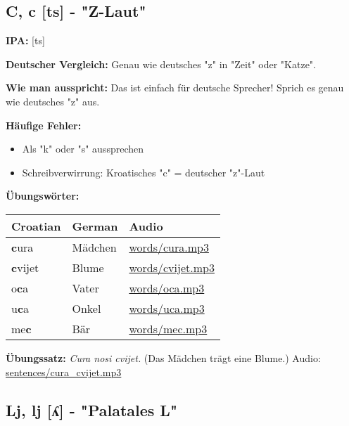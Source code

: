 \subsection{C, c [ts] - "Z-Laut"}

\begin{tcolorbox}[breakable, colback=lightyellow!30, colframe=orange, title=\textbf{C, c}]

\textbf{IPA:} [ts]

\textbf{Deutscher Vergleich:}
Genau wie deutsches "z" in "Zeit" oder "Katze".

\textbf{Wie man ausspricht:}
Das ist einfach für deutsche Sprecher! Sprich es genau wie deutsches "z" aus.

\textbf{Häufige Fehler:}
\begin{itemize}
    \item Als "k" oder "s" aussprechen
    \item Schreibverwirrung: Kroatisches "c" = deutscher "z"-Laut
\end{itemize}

\textbf{Übungswörter:}
\begin{center}
\small
\begin{tabular}{lll}
\textbf{Croatian} & \textbf{German} & \textbf{Audio} \\
\midrule
\textbf{c}ura & Mädchen & \small\url{words/cura.mp3} \\
\textbf{c}vijet & Blume & \small\url{words/cvijet.mp3} \\
o\textbf{c}a & Vater & \small\url{words/oca.mp3} \\
u\textbf{c}a & Onkel & \small\url{words/uca.mp3} \\
me\textbf{c} & Bär & \small\url{words/mec.mp3} \\
\end{tabular}
\end{center}

\textbf{Übungssatz:}
\textit{Cura nosi cvijet.}
(Das Mädchen trägt eine Blume.)
Audio: \small\url{sentences/cura\_cvijet.mp3}

\end{tcolorbox}

\subsection{Lj, lj [ʎ] - "Palatales L"}

